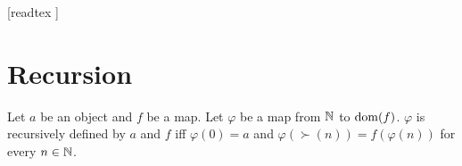 \documentclass[10pt]{article}
\begin{document}
  \begin{imports}
    \begin{forthel}

      [readtex ]

    \end{forthel}
  \end{imports}


  \section{Recursion}

  \begin{forthel}
    \begin{definition}
      Let $a$ be an object and $f$ be a map.
      Let $\varphi$ be a map from $\mathbb{N}$ to $\operatorname{dom}(f)$.
      $\varphi$ is recursively defined by $a$ and $f$ iff $\varphi(0) = a$ and
      $\varphi(\succ(n)) = f(\varphi(n))$ for every $n \in \mathbb{N}$.
    \end{definition}
  \end{forthel}
\end{document}

